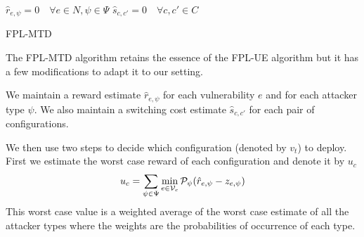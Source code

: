 \begin{algorithm}
\DontPrintSemicolon
$\hat{r}_{e,\psi} = 0 \quad \forall e \in N, \psi \in \Psi$\;
$\hat{s}_{c, c'} = 0 \quad \forall c, c' \in C$\;
\caption{FPL-MTD}
\label{alg:fpl-mtd}
\end{algorithm}

The FPL-MTD algorithm retains the essence of the FPL-UE algorithm \citep{long2016fplue} but it has a few modifications to adapt it to our setting.  

We maintain a reward estimate $\hat{r}_{e, \psi}$ for each vulnerability $e$ and for each attacker type $\psi$. We also maintain a switching cost estimate $\hat{s}_{c, c'}$ for each pair of configurations. 

We then use two steps to decide which configuration (denoted by $v_t$) to deploy. First we estimate the worst case reward of each configuration and denote it by $u_c$
\begin{align*}
    u_c = \sum_{\psi \in \Psi} \min_{e \in \cal V_c} \cal P_{\psi} (\hat{r}_{e, \psi} - z_{e, \psi}) 
\end{align*}
This worst case value is a weighted average of the worst case estimate of all the attacker types where the weights are the probabilities of occurrence of each type.

